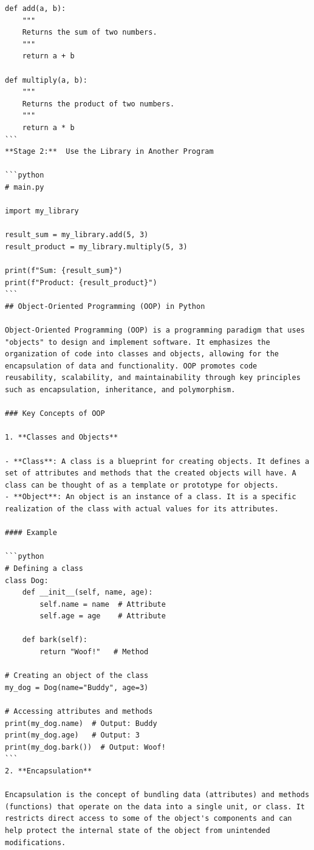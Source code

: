 \documentclass[
  letterpaper,
  DIV=11,
  numbers=noendperiod]{scrreprt}
\theoremstyle{plain}
\theoremstyle{definition}
\theoremstyle{remark}
\begin{document}
\begin{verbatim}
def add(a, b):
    """
    Returns the sum of two numbers.
    """
    return a + b

def multiply(a, b):
    """
    Returns the product of two numbers.
    """
    return a * b
```
**Stage 2:**  Use the Library in Another Program

```python
# main.py

import my_library

result_sum = my_library.add(5, 3)
result_product = my_library.multiply(5, 3)

print(f"Sum: {result_sum}")
print(f"Product: {result_product}")
```
## Object-Oriented Programming (OOP) in Python

Object-Oriented Programming (OOP) is a programming paradigm that uses "objects" to design and implement software. It emphasizes the organization of code into classes and objects, allowing for the encapsulation of data and functionality. OOP promotes code reusability, scalability, and maintainability through key principles such as encapsulation, inheritance, and polymorphism.

### Key Concepts of OOP

1. **Classes and Objects**

- **Class**: A class is a blueprint for creating objects. It defines a set of attributes and methods that the created objects will have. A class can be thought of as a template or prototype for objects.
- **Object**: An object is an instance of a class. It is a specific realization of the class with actual values for its attributes.

#### Example

```python
# Defining a class
class Dog:
    def __init__(self, name, age):
        self.name = name  # Attribute
        self.age = age    # Attribute
    
    def bark(self):
        return "Woof!"   # Method

# Creating an object of the class
my_dog = Dog(name="Buddy", age=3)

# Accessing attributes and methods
print(my_dog.name)  # Output: Buddy
print(my_dog.age)   # Output: 3
print(my_dog.bark())  # Output: Woof!
```
2. **Encapsulation**

Encapsulation is the concept of bundling data (attributes) and methods (functions) that operate on the data into a single unit, or class. It restricts direct access to some of the object's components and can help protect the internal state of the object from unintended modifications.


\end{verbatim}
\end{document}
